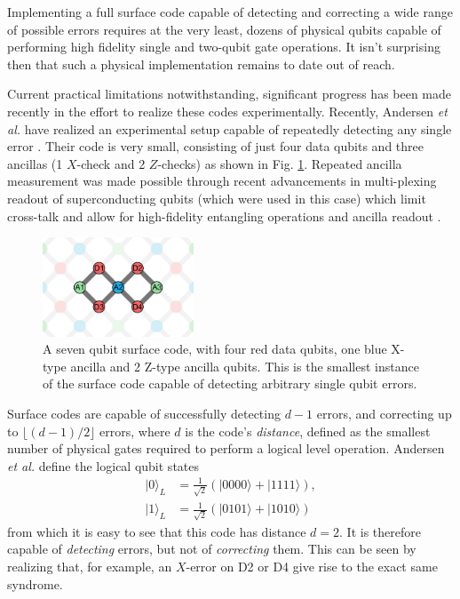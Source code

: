 Implementing a full surface code capable of detecting and correcting a wide
range of possible errors requires at the very least, dozens of physical qubits
capable of performing high fidelity single and two-qubit gate operations. It
isn't surprising then that such a physical implementation remains to date out of
reach. 

Current practical limitations notwithstanding, significant progress has been
made recently in the effort to realize these codes experimentally. Recently,
Andersen \textit{et al.} have realized an experimental setup capable of
repeatedly detecting any single error \cite{Andersen_2020}. Their code is very
small, consisting of just four data qubits and three ancillas (1 $X$-check and 2
$Z$-checks) as shown in Fig. \ref{fig:seven_qbit_code}. Repeated ancilla
measurement was made possible through recent advancements in multi-plexing
readout of superconducting qubits (which were used in this case) which limit
cross-talk and allow for high-fidelity entangling operations and ancilla readout
\cite{barends14_super_quant_circuit_at_surfac} \cite{Bultink_2020}.

\begin{figure}[h]
  \centering
  \includegraphics[width=0.4\textwidth]{images/seven_qbit_code.png}
  \caption{A seven qubit surface code, with four red data qubits, one blue
    X-type ancilla and 2 Z-type ancilla qubits. This is the smallest instance of
    the surface code capable of detecting arbitrary single qubit errors.}
  \label{fig:seven_qbit_code}
\end{figure}

Surface codes are capable of successfully detecting $d-1$ errors, and correcting
up to $\lfloor{(d-1)/2} \rfloor$ errors, where $d$ is the code's
\textit{distance}, defined as the smallest number of physical gates required to
perform a logical level operation. Andersen \textit{et al.} define the logical
qubit states
\begin{align}
|0\rangle_L &= \frac{1}{\sqrt{2}} (|0000\rangle + |1111\rangle) , \\
|1\rangle_L &= \frac{1}{\sqrt{2}} (|0101\rangle + |1010\rangle) 
\end{align}
from which it is easy to see that this code has distance $d=2$. It is therefore
capable of \textit{detecting} errors, but not of \textit{correcting} them. This
can be seen by realizing that, for example, an $X$-error on D2 or D4 give rise
to the exact same syndrome.

